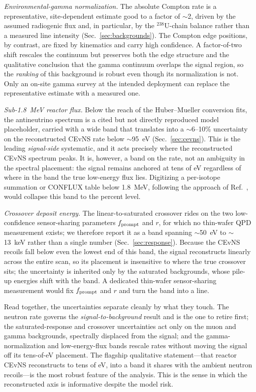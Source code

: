 \emph{Environmental-gamma normalization.} The absolute Compton rate is a
representative, site-dependent estimate good to a factor of $\sim$2, driven
by the assumed radiogenic flux and, in particular, by the ${}^{238}$U-chain
balance rather than a measured line intensity (Sec.~\ref{sec:backgrounds}).
The Compton edge positions, by contrast, are fixed by kinematics and carry
high confidence. A factor-of-two shift rescales the continuum but preserves
both the edge structure and the qualitative conclusion that the gamma
continuum overlaps the signal region, so the \emph{ranking} of this
background is robust even though its normalization is not. Only an on-site
gamma survey at the intended deployment can replace the representative
estimate with a measured one.

\emph{Sub-1.8~MeV reactor flux.} Below the reach of the Huber--Mueller
conversion fits, the antineutrino spectrum is a cited but not directly
reproduced model placeholder, carried with a wide band that translates into
a $\sim$6--10\% uncertainty on the reconstructed CEvNS rate below $\sim$95~eV
(Sec.~\ref{sec:cevns}). This is the leading \emph{signal-side} systematic,
and it acts precisely where the reconstructed CEvNS spectrum peaks. It is,
however, a band on the rate, not an ambiguity in the spectral placement: the
signal remains anchored at tens of eV regardless of where in the band the
true low-energy flux lies. Digitizing a per-isotope summation or CONFLUX
table below 1.8~MeV, following the approach of Ref.~\cite{kopeikin2012},
would collapse this band to the percent level.

\emph{Crossover deposit energy.} The linear-to-saturated crossover rides on
the two low-confidence sensor-sharing parameters $f_{\rm prompt}$ and $r$,
for which no thin-wafer QPD measurement exists; we therefore report it as a
band spanning $\sim$50~eV to $\sim$13~keV rather than a single number
(Sec.~\ref{sec:response}). Because the CEvNS recoils fall below even the
lowest end of this band, the signal reconstructs linearly across the entire
scan, so its placement is insensitive to where the true crossover sits; the
uncertainty is inherited only by the saturated backgrounds, whose pile-up
energies shift with the band. A dedicated thin-wafer sensor-sharing
measurement would fix $f_{\rm prompt}$ and $r$ and turn the band into a line.

Read together, the uncertainties separate cleanly by what they touch. The
neutron rate governs the \emph{signal-to-background} result and is the one to
retire first; the saturated-response and crossover uncertainties act only on
the muon and gamma backgrounds, spectrally displaced from the signal; and the
gamma-normalization and low-energy-flux bands rescale rates without moving the
signal off its tens-of-eV placement. The flagship qualitative statement---that
reactor CEvNS reconstructs to tens of eV, into a band it shares with the
ambient neutron recoils---is the most robust feature of the analysis. This is
the sense in which the reconstructed axis is informative despite the model
risk.

